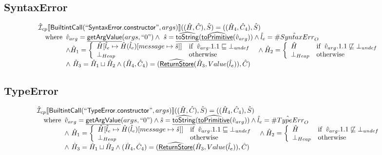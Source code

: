 \documentclass{article}
\newcommand{\SF}[1]{\mbox{\textsf{#1}}}
\newcommand{\wherec}[1]{{\rm where}\begin{array}[t]{l}#1\end{array}}
\newcommand{\ifc}[1]{{\rm if}\begin{array}[t]{l}#1\end{array}}
\newcommand{\owc}{{\rm otherwise}}
\newcommand{\aI}{\hat{\mathcal{I}}}
\newcommand{\lbr}{\llbracket}
\newcommand{\rbr}{\rrbracket}
\newcommand{\hf}[1]{\underline{\sf #1}}
\newcommand{\ahf}[1]{\widehat{\underline{\sf #1}}}
\newcommand{\avarloc}[1]{\hat{\##1}}
\begin{document}
\subsection{SyntaxError}
\[
\begin{array}{l}
\aI _{cp}\lbr \SF{BuiltintCall}(``\SF{SyntaxError.constructor}",args)\rbr((\hat{H},\hat{C}), \hat{S})
  = ((\hat{H}_4, \hat{C}_4), \hat{S})\\
\quad\wherec{
  \hat{v}_{arg} = \hf{getArgValue}(args, ``0")
  \land\ \hat{s}= \ahf{toString}(\ahf{toPrimitive}(\hat{v}_{arg}))
  \land \hat{l}_e = \avarloc{SyntaxErr}_O\\
  \land \hat{H}_1 = \left\{\begin{array}{ll}
      \hat{H}[\hat{l}_e \mapsto \hat{H}(\hat{l}_e)[message \mapsto \hat{s}]]
      & \ifc{\hat{v}_{arg}.1.1 \sqsubseteq \bot_{undef}}\\
      \bot_{Heap} & \owc
    \end{array}\right.
  \land \hat{H}_2 = \left\{\begin{array}{ll}
      \hat{H}
      & \ifc{\hat{v}_{arg}.1.1 \not\sqsubseteq \bot_{undef}}\\
      \bot_{Heap} & \owc
    \end{array}\right.\\
  \land\ \hat{H}_3 = \hat{H}_1 \sqcup \hat{H}_2
  \land (\hat{H}_4, \hat{C}_4) = (\ahf{ReturnStore}(\hat{H}_3, Value(\hat{l}_e)), \hat{C})\\
  }\\

\end{array}
\]


\subsection{TypeError}
\[
\begin{array}{l}
\aI _{cp}\lbr \SF{BuiltintCall}(``\SF{TypeError.constructor}",args)\rbr((\hat{H},\hat{C}), \hat{S})
  = ((\hat{H}_4, \hat{C}_4), \hat{S})\\
\quad\wherec{
  \hat{v}_{arg} = \hf{getArgValue}(args, ``0")
  \land \hat{s}= \ahf{toString}(\ahf{toPrimitive}(\hat{v}_{arg}))
  \land \hat{l}_e = \avarloc{TypeErr}_O\\
  \land\ \hat{H}_1 = \left\{\begin{array}{ll}
      \hat{H}[\hat{l}_e \mapsto \hat{H}(\hat{l}_e)[message \mapsto \hat{s}]]
      & \ifc{\hat{v}_{arg}.1.1 \sqsubseteq \bot_{undef}}\\
      \bot_{Heap} & \owc
    \end{array}\right.
  \land \hat{H}_2 = \left\{\begin{array}{ll}
      \hat{H}
      & \ifc{\hat{v}_{arg}.1.1 \not\sqsubseteq \bot_{undef}}\\
      \bot_{Heap} & \owc
    \end{array}\right.\\
  \land\ \hat{H}_3 = \hat{H}_1 \sqcup \hat{H}_2
  \land (\hat{H}_4, \hat{C}_4) = (\ahf{ReturnStore}(\hat{H}_3, Value(\hat{l}_e)), \hat{C})\\
  }\\

\end{array}
\]
\end{document}
